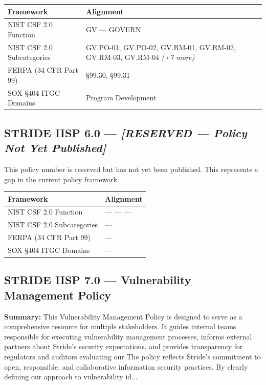 \documentclass[11pt,landscape]{article}
\begin{document}
\begin{tabularx}{\textwidth}{|p{4cm}|X|}
\hline
\rowcolor{headgray} \textbf{Framework} & \textbf{Alignment} \\
\hline
NIST CSF 2.0 Function & GV --- GOVERN \\
\hline
NIST CSF 2.0 Subcategories & GV.PO-01, GV.PO-02, GV.RM-01, GV.RM-02, GV.RM-03, GV.RM-04 \textit{(+7 more)} \\
\hline
FERPA (34 CFR Part 99) & §99.30, §99.31 \\
\hline
SOX §404 ITGC Domains & Program Development \\
\hline
\end{tabularx}


\subsection{\textcolor{gapred}{STRIDE IISP 6.0} --- \textit{[RESERVED — Policy Not Yet Published]}}
\label{pol:IISP60}

\colorbox{gapred!10}{\parbox{0.95\textwidth}{\textcolor{gapred}{This policy number is reserved but has not yet been published. This represents a gap in the current policy framework.}}}

\begin{tabularx}{\textwidth}{|p{4cm}|X|}
\hline
\rowcolor{headgray} \textbf{Framework} & \textbf{Alignment} \\
\hline
NIST CSF 2.0 Function & --- --- --- \\
\hline
NIST CSF 2.0 Subcategories & --- \\
\hline
FERPA (34 CFR Part 99) & --- \\
\hline
SOX §404 ITGC Domains & --- \\
\hline
\end{tabularx}


\subsection{\textcolor{strideblue}{STRIDE IISP 7.0} --- Vulnerability Management Policy}
\label{pol:IISP70}

\textbf{Summary:} This Vulnerability Management Policy is designed to serve as a comprehensive resource for multiple stakeholders. It guides internal teams responsible for executing vulnerability management processes, informs external partners about Stride’s security expectations, and provides transparency for regulators and auditors evaluating our The policy reflects Stride’s commitment to open, responsible, and collaborative information security practices. By clearly defining our approach to vulnerability id...
\end{document}
